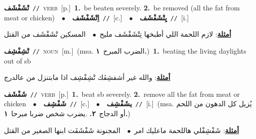 \documentclass[10pt,a4paper,twoside]{article} %
\begin{document}
\begin{multicols}{2}
{\setlength\topsep{0pt}\textbf{\foreignlanguage{arabic}{تْشَفْشَف}}\ {\color{gray}\texttt{//}\color{black}}\ \textsc{verb}\ [p.]\ \textbf{1.}~be beaten severely.  \textbf{2.}~be removed (all the fat from meat or chicken)\ \ $\bullet$\ \ \setlength\topsep{0pt}\textbf{\foreignlanguage{arabic}{اِتْشَفْشَف}}\ {\color{gray}\texttt{//}\color{black}}\ [c.]\ \ $\bullet$\ \ \setlength\topsep{0pt}\textbf{\foreignlanguage{arabic}{يِتْشَفْشَف}}\ {\color{gray}\texttt{//}\color{black}}\ [i.]\  \begin{flushright}\color{gray}\foreignlanguage{arabic}{\textbf{\underline{\foreignlanguage{arabic}{أمثلة}}}: لازم اللحمة اللي أطبخها تِتْشَفْشَف مليح\ $\bullet$\ \  المسكين تْشَفْشَف من القتل}\end{flushright}\color{black}} \vspace{2mm}

{\setlength\topsep{0pt}\textbf{\foreignlanguage{arabic}{تْشِفْشِف}}\ {\color{gray}\texttt{//}\color{black}}\ \textsc{noun}\ [m.]\ \color{gray}(msa. \foreignlanguage{arabic}{الضرب المبرح}~\foreignlanguage{arabic}{\textbf{١.}})\color{black}\ \textbf{1.}~beating the living daylights out of sb\  \begin{flushright}\color{gray}\foreignlanguage{arabic}{\textbf{\underline{\foreignlanguage{arabic}{أمثلة}}}: والله غير أشفشِفَك تْشِفْشِف اذا مابتنزل من عالدرج}\end{flushright}\color{black}} \vspace{2mm}

{\setlength\topsep{0pt}\textbf{\foreignlanguage{arabic}{شَفْشَف}}\ {\color{gray}\texttt{//}\color{black}}\ \textsc{verb}\ [p.]\ \textbf{1.}~beat sb severely.  \textbf{2.}~remove all the fat from meat or chicken\ \ $\bullet$\ \ \setlength\topsep{0pt}\textbf{\foreignlanguage{arabic}{شَفْشِف}}\ {\color{gray}\texttt{//}\color{black}}\ [c.]\ \ $\bullet$\ \ \setlength\topsep{0pt}\textbf{\foreignlanguage{arabic}{يشَفْشِف}}\ {\color{gray}\texttt{//}\color{black}}\ [i.]\ \color{gray}(msa. \foreignlanguage{arabic}{يُزيل كل الدهون من اللحم أو الدجاج}~\foreignlanguage{arabic}{\textbf{٢.}}  .\foreignlanguage{arabic}{يضرب شخص ضربا مبرحا}~\foreignlanguage{arabic}{\textbf{١.}})\color{black}\  \begin{flushright}\color{gray}\foreignlanguage{arabic}{\textbf{\underline{\foreignlanguage{arabic}{أمثلة}}}: شَفْشِفْلي هاللحمة ماعليك امر\ $\bullet$\ \  المجنونة شَفْشَفَت ابنها الصغير من القتل}\end{flushright}\color{black}} \vspace{2mm}


\end{multicols}
\end{document}
